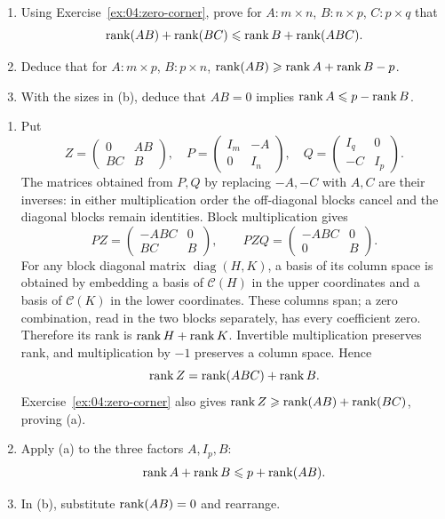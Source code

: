 \begin{problem}\label{ex:04:block-frobenius}
\begin{enumerate}
\item Using Exercise~\ref{ex:04:zero-corner}, prove for
\(A:m\times n\), \(B:n\times p\), \(C:p\times q\) that
\[
\operatorname{rank}(AB)+\operatorname{rank}(BC)\leqslant\operatorname{rank} B+\operatorname{rank}(ABC).
\]
\item Deduce that for \(A:m\times p\), \(B:p\times n\),
\(\operatorname{rank}(AB)\geqslant\operatorname{rank} A+\operatorname{rank} B-p\).
\item With the sizes in (b), deduce that \(AB=0\) implies
\(\operatorname{rank} A\leqslant p-\operatorname{rank} B\).
\end{enumerate}
\end{problem}
\begin{solution}
\begin{enumerate}
\item Put
\[
Z=\begin{pmatrix}0&AB\\BC&B\end{pmatrix},\quad
P=\begin{pmatrix}I_m&-A\\0&I_n\end{pmatrix},\quad
Q=\begin{pmatrix}I_q&0\\-C&I_p\end{pmatrix}.
\]
The matrices obtained from \(P,Q\) by replacing \(-A,-C\) with \(A,C\)
are their inverses: in either multiplication order the off-diagonal
blocks cancel and the diagonal blocks remain identities.
Block multiplication gives
\[
PZ=\begin{pmatrix}-ABC&0\\BC&B\end{pmatrix},\qquad
PZQ=\begin{pmatrix}-ABC&0\\0&B\end{pmatrix}.
\]
For any block diagonal matrix \(\operatorname{diag}(H,K)\),
a basis of its column space is obtained by embedding a basis of
\(\mathcal C(H)\) in the upper coordinates and a basis of
\(\mathcal C(K)\) in the lower coordinates.
These columns span; a zero combination, read in the two blocks separately,
has every coefficient zero. Therefore its rank is \(\operatorname{rank} H+\operatorname{rank} K\).
Invertible multiplication preserves rank, and multiplication by \(-1\)
preserves a column space. Hence
\[
\operatorname{rank} Z=\operatorname{rank}(ABC)+\operatorname{rank} B.
\]
Exercise~\ref{ex:04:zero-corner} also gives
\(\operatorname{rank} Z\geqslant\operatorname{rank}(AB)+\operatorname{rank}(BC)\), proving (a).
\item Apply (a) to the three factors \(A,I_p,B\):
\[
\operatorname{rank} A+\operatorname{rank} B\leqslant p+\operatorname{rank}(AB).
\]
\item In (b), substitute \(\operatorname{rank}(AB)=0\) and rearrange.
\end{enumerate}
\end{solution}

